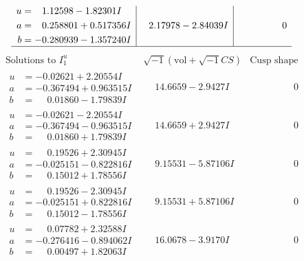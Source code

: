 \documentclass[1p]{elsarticle_modified}
\theoremstyle{definition}
\newcommand{\I}{\sqrt{-1}}
\begin{document}
$$\begin{array}{c|c|c}
\begin{aligned}
u &= \phantom{-}1.12598 - 1.82301 I \\
a &= \phantom{-}0.258801 + 0.517356 I \\
b &= -0.280939 - 1.357240 I\end{aligned}
 & \phantom{-}2.17978 - 2.84039 I & \phantom{-0.000000 } 0\\
 \hline 
 \end{array}$$\newpage$$\begin{array}{c|c|c}  
\text{Solutions to }I^u_{1}& \I (\text{vol} + \sqrt{-1}CS) & \text{Cusp shape}\\
 \hline 
\begin{aligned}
u &= -0.02621 + 2.20554 I \\
a &= -0.367494 + 0.963515 I \\
b &= \phantom{-}0.01860 - 1.79839 I\end{aligned}
 & \phantom{-}14.6659 - 2.9427 I & \phantom{-0.000000 } 0 \\ \hline\begin{aligned}
u &= -0.02621 - 2.20554 I \\
a &= -0.367494 - 0.963515 I \\
b &= \phantom{-}0.01860 + 1.79839 I\end{aligned}
 & \phantom{-}14.6659 + 2.9427 I & \phantom{-0.000000 } 0 \\ \hline\begin{aligned}
u &= \phantom{-}0.19526 + 2.30945 I \\
a &= -0.025151 - 0.822816 I \\
b &= \phantom{-}0.15012 + 1.78556 I\end{aligned}
 & \phantom{-}9.15531 - 5.87106 I & \phantom{-0.000000 } 0 \\ \hline\begin{aligned}
u &= \phantom{-}0.19526 - 2.30945 I \\
a &= -0.025151 + 0.822816 I \\
b &= \phantom{-}0.15012 - 1.78556 I\end{aligned}
 & \phantom{-}9.15531 + 5.87106 I & \phantom{-0.000000 } 0 \\ \hline\begin{aligned}
u &= \phantom{-}0.07782 + 2.32588 I \\
a &= -0.276416 - 0.894062 I \\
b &= \phantom{-}0.00497 + 1.82063 I\end{aligned}
 & \phantom{-}16.0678 - 3.9170 I & \phantom{-0.000000 } 0 \\ \hline\begin{aligned}

\end{aligned}
\end{array}$$
\end{document}
